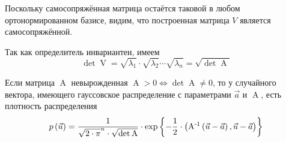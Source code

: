 \begin{remark}
  Поскольку самосопряжённая матрица остаётся таковой в любом ортонормированном
  базисе, видим, что построенная матрица $V$ является самосопряжённой.
\end{remark}

\begin{remark}
  Так как определитель инвариантен, имеем
  \begin{equation*}
    \det{\operatorname{V}}
    = \sqrt{\lambda_1} \cdot \sqrt{\lambda_2} \cdots \sqrt{\lambda_n}
    = \sqrt{\det{\operatorname{A}}}
  \end{equation*}
\end{remark}

\begin{theorem}
  \label{theorem:gaussianVector:dencity}
  Если матрица $\operatorname{A}$ невырожденная
  $\operatorname{A} > 0 \Leftrightarrow \det{\operatorname{A}} \neq 0$,
  то у случайного вектора, имеющего гауссовское распределение с параметрами
  $\vec{a}$ и $\operatorname{A}$, есть плотность распределения
  $$p\left(\vec{u}\right)
      = \frac{1}{\sqrt{2 \cdot \pi}^n \cdot \sqrt{\det{\operatorname{A}}}}
      \cdot \exp{\left\{ -\frac{1}{2} \cdot \left(
          \operatorname{A^{-1}} \left( \vec{u} - \vec{a} \right),
          \vec{u} - \vec{a} \right) \right\}}$$
\end{theorem}
